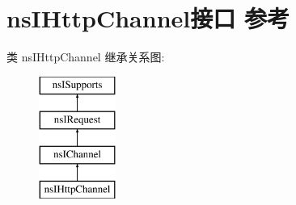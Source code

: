 \hypertarget{interfacens_i_http_channel}{}\section{ns\+I\+Http\+Channel接口 参考}
\label{interfacens_i_http_channel}
类 ns\+I\+Http\+Channel 继承关系图\+:\begin{figure}[H]
\begin{center}
\leavevmode
\includegraphics[height=4.000000cm]{interfacens_i_http_channel}
\end{center}
\end{figure}
